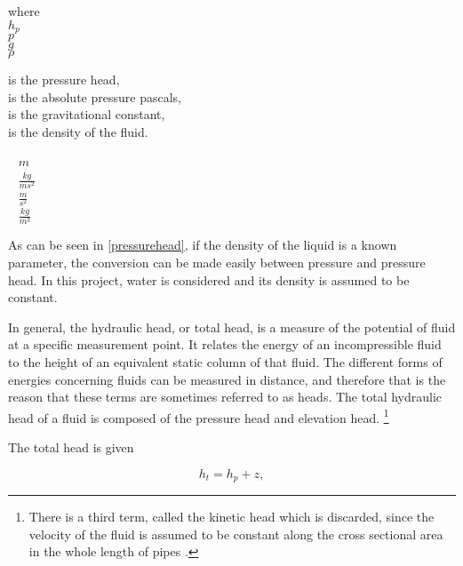 \begin{minipage}[t]{0.20\textwidth}
where\\
\hspace*{8mm} $h_p$ \\
\hspace*{8mm} $p$ \\
\hspace*{8mm} $g$ \\
\hspace*{8mm} $\rho$ 
\end{minipage}
\begin{minipage}[t]{0.68\textwidth}
\vspace*{2mm}
is the pressure head,\\
is the absolute pressure pascals, \\
is the gravitational constant, \\
is the density of the fluid.
\end{minipage}
\begin{minipage}[t]{0.1\textwidth}
\vspace*{2mm}
\textcolor{White}{te}$\unit{m}$\\
\textcolor{White}{te}$\unit{\frac{kg}{ms^2}}$\\
\textcolor{White}{te}$\unit{\frac{m}{s^2}}$\\
\textcolor{White}{te}$\unit{\frac{kg}{m^3}}$
\end{minipage}

As can be seen in \eqref{pressurehead}, if the density of the liquid is a known parameter, the conversion can be made easily between pressure and pressure head. In this project, water is considered and its density is assumed to be constant. 

In general, the hydraulic head, or total head, is a measure of the potential of fluid at a specific measurement point. It relates the energy of an incompressible fluid to the height of an equivalent static column of that fluid. The different forms of energies concerning fluids can be measured in distance, and therefore that is the reason that these terms are sometimes referred to as heads. The total hydraulic head of a fluid is composed of the pressure head and elevation head. \footnote{There is a third term, called the kinetic head which is discarded, since the velocity of the fluid is assumed to be constant along the cross sectional area in the whole length of pipes \cite{chen2016sustainable}.}

The total head is given 

\begin{equation}
\label{totalhead}
  h_t = h_p + z,
\end{equation}

